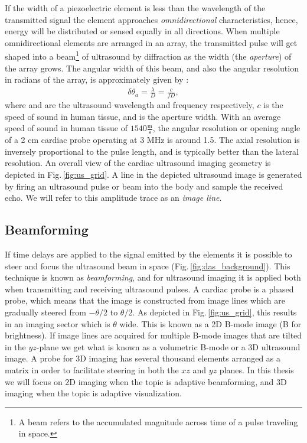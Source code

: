 If the width of a piezoelectric element is less than the wavelength of the transmitted signal the element approaches \textit{omnidirectional} characteristics, hence, energy will be distributed or sensed equally in all directions. When multiple omnidirectional elements are arranged in an array, the transmitted pulse will get shaped into a beam\footnote{A beam refers to the accumulated magnitude across time of a pulse traveling in space.} of ultrasound by diffraction as the width (the \textit{aperture}) of the array grows. The angular width of this beam, and also the angular resolution in radians of the array, is approximately given by \cite{AngelUltrasound}:
\begin{align}\label{eq:res}
\delta\theta_a = \frac{\lambda}{D} = \frac{c}{fD},
\end{align}
where  and  are the ultrasound wavelength and frequency respectively, $c$ is the speed of sound in human tissue, and  is the aperture width. With an average speed of sound in human tissue of $1540\frac{\text{m}}{\text{s}}$, the angular resolution or opening angle of a 2 cm cardiac probe operating at 3 MHz is around 1.5\degree. The axial resolution is inversely proportional to the pulse length, and is typically better than the lateral resolution. An overall view of the cardiac ultrasound imaging geometry is depicted in Fig.\,\ref{fig:us_grid}. A line in the depicted ultrasound image is generated by firing an ultrasound pulse or beam into the body and sample the received echo. We will refer to this amplitude trace as an \textit{image line}. 

\subsection{Beamforming}
If time delays are applied to the signal emitted by the elements it is possible to steer and focus the ultrasound beam in space (Fig.\,\ref{fig:das_background}). This technique is known as \textit{beamforming}, and for ultrasound imaging it is applied both when transmitting and receiving ultrasound pulses. A cardiac probe is a phased probe, which means that the image is constructed from image lines which are gradually steered from $-\theta/2$ to $\theta/2$. As depicted in Fig.\,\ref{fig:us_grid}, this results in an imaging sector which is $\theta$ wide. This is known as a 2D B-mode image (B for brightness). If image lines are acquired for multiple B-mode images that are tilted in the $yz$-plane we get what is known as a volumetric B-mode or a 3D ultrasound image. A probe for 3D imaging has several thousand elements arranged as a matrix in order to facilitate steering in both the $xz$ and $yz$ planes. In this thesis we will focus on 2D imaging when the topic is adaptive beamforming, and 3D imaging when the topic is adaptive visualization.

